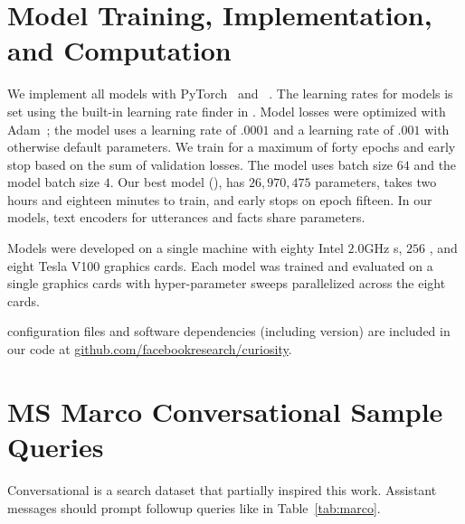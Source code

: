 \section{Model Training, Implementation, and Computation}
\label{apx:method:train}

We implement all models with PyTorch~\citep{paszke2017automatic} and \allennlp{}~\citep{Gardner2018AllenNLPAD}.
The learning rates for models is set using the built-in learning rate finder in \allennlp{}.
Model losses were optimized with Adam~\citep{Kingma2014AdamAM}; the \bert{} model uses a learning rate of $.0001$ and \charm{} a learning rate of $.001$ with otherwise default parameters.
We train for a maximum of forty epochs and early stop based on the sum of validation losses.
The \charm{} model uses batch size $64$ and the \bert{} model batch size $4$.
Our best model (\charm{}), has $26,970,475$ parameters, takes two hours and eighteen minutes to train, and early stops on epoch fifteen.
In our models, text encoders for utterances and facts share parameters.

Models were developed on a single machine with eighty Intel $2.0$GHz s, $256$ , and eight Tesla V100 graphics cards.
Each model was trained and evaluated on a single graphics cards with hyper-parameter sweeps parallelized across the eight cards.

\allennlp{} configuration files and software dependencies (including version) are included in our code at \href{https://github.com/facebookresearch/curiosity}{github.com/facebookresearch/curiosity}.

\section{MS Marco Conversational Sample Queries}
\label{apx:marco}

Conversational  is a search dataset that partially inspired this work.
Assistant messages should prompt followup queries like in Table~\ref{tab:marco}.

